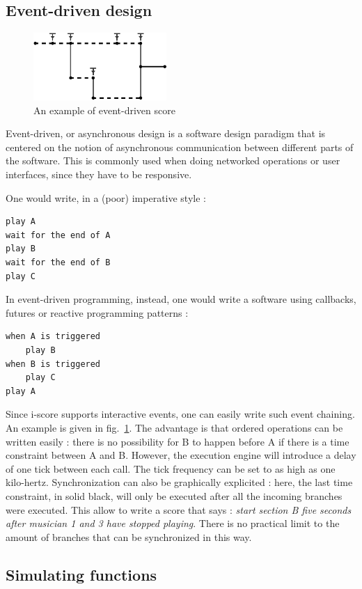 \documentclass{article}
\begin{document}
\subsection{Event-driven design}
\begin{figure}
    \centering
    \includegraphics[width=0.45\textwidth]{images/event.eps}
    \caption{An example of event-driven score}
    \label{fig.event}
\end{figure}
Event-driven, or asynchronous design is a software design 
paradigm that is centered on the notion of asynchronous 
communication between different parts of the software.
This is commonly used when doing networked operations or 
user interfaces, since they have to be responsive.

One would write, in a (poor) imperative style : 
\begin{lstlisting}
play A
wait for the end of A
play B
wait for the end of B
play C
\end{lstlisting}
In event-driven programming, instead, one would write a software 
using callbacks, futures or reactive programming patterns\cite{kambona2013evaluation} :
\begin{lstlisting}
when A is triggered
    play B
when B is triggered
    play C    
play A
\end{lstlisting}

Since i-score supports interactive events, one can easily write such event chaining.
An example is given in fig.~\ref{fig.event}. 
The advantage is that ordered operations can be written easily : there is no 
possibility for B to happen before A if there is a time constraint between A and B.
However, the execution engine will introduce a delay of one tick between each call.
The tick frequency can be set to as high as one kilo-hertz.
Synchronization can also be graphically explicited : here, the last time constraint, in solid black, will 
only be executed after all the incoming branches were executed. 
This allow to write a score that says : \emph{start section B five seconds after musician 1 and 3 
have stopped playing}.
There is no practical limit to the amount of branches that can be synchronized in this way.

\subsection{Simulating functions}
\end{document}
